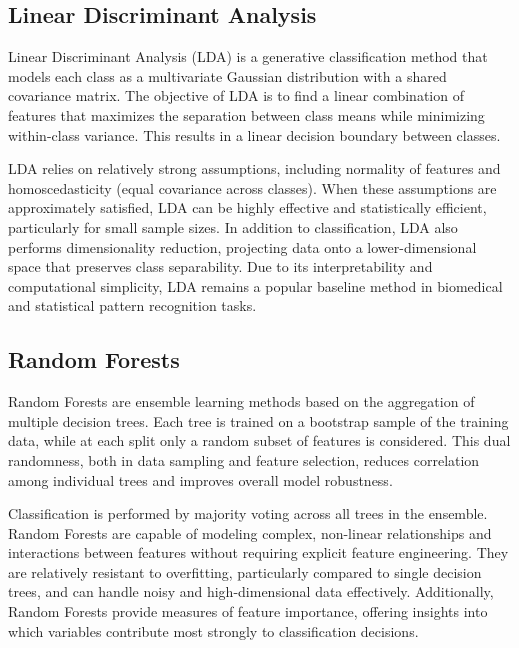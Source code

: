 \documentclass[en]{dimscthesis}
\begin{document}
\subsection{Linear Discriminant Analysis} \label{LDA}

Linear Discriminant Analysis (LDA) \cite{bib:lda} is a generative classification method that models each class as a multivariate Gaussian distribution with a shared covariance matrix. The objective of LDA is to find a linear combination of features that maximizes the separation between class means while minimizing within-class variance. This results in a linear decision boundary between classes.

LDA relies on relatively strong assumptions, including normality of features and homoscedasticity (equal covariance across classes). When these assumptions are approximately satisfied, LDA can be highly effective and statistically efficient, particularly for small sample sizes. In addition to classification, LDA also performs dimensionality reduction, projecting data onto a lower-dimensional space that preserves class separability. Due to its interpretability and computational simplicity, LDA remains a popular baseline method in biomedical and statistical pattern recognition tasks.

\subsection{Random Forests} \label{rfs}

Random Forests \cite{bib:random_forest} are ensemble learning methods based on the aggregation of multiple decision trees. Each tree is trained on a bootstrap sample of the training data, while at each split only a random subset of features is considered. This dual randomness, both in data sampling and feature selection, reduces correlation among individual trees and improves overall model robustness.

Classification is performed by majority voting across all trees in the ensemble. Random Forests are capable of modeling complex, non-linear relationships and interactions between features without requiring explicit feature engineering. They are relatively resistant to overfitting, particularly compared to single decision trees, and can handle noisy and high-dimensional data effectively. Additionally, Random Forests provide measures of feature importance, offering insights into which variables contribute most strongly to classification decisions.
\end{document}
